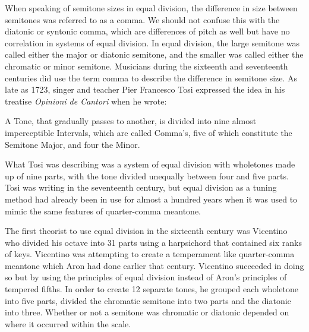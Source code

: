 When speaking of semitone sizes in equal division, the difference in size between
semitones was referred to as a comma.  We should not confuse this with the diatonic or
syntonic comma, which are differences of pitch as well but have no correlation in systems
of equal division.  In equal division, the large semitone was called either the major or
diatonic semitone, and the smaller was called either the chromatic or minor semitone.
Musicians during the sixteenth and seventeenth centuries did use the term comma to
describe the difference in semitone size.  As late as 1723, singer and teacher Pier
Francesco Tosi expressed the idea in his treatise \textit{Opinioni de Cantori} when he
wrote:
\begin{blocks}
A Tone, that gradually passes to another, is divided into nine almost imperceptible
Intervals, which are called Comma's, five of which constitute the Semitone Major, and four
the Minor.
\autocite[20]{PFT:1}
\end{blocks}
What Tosi was describing was a system of equal division with wholetones made up of nine
parts, with the tone divided unequally between four and five parts.  Tosi was writing in
the seventeenth century, but equal division as a tuning method had already been in use for
almost a hundred years when it was used to mimic the same features of quarter-comma
meantone.

The first theorist to use equal division in the sixteenth century was Vicentino who
divided his octave into 31 parts using a harpsichord that contained six ranks of keys.
Vicentino was attempting to create a temperament like quarter-comma meantone which Aron
had done earlier that century.  Vicentino succeeded in doing so but by using the
principles of equal division instead of Aron's principles of tempered fifths. In order to
create 12 separate tones, he grouped each wholetone into five parts, divided the chromatic
semitone into two parts and the diatonic into three.  Whether or not a semitone was
chromatic or diatonic depended on where it occurred within the scale.

